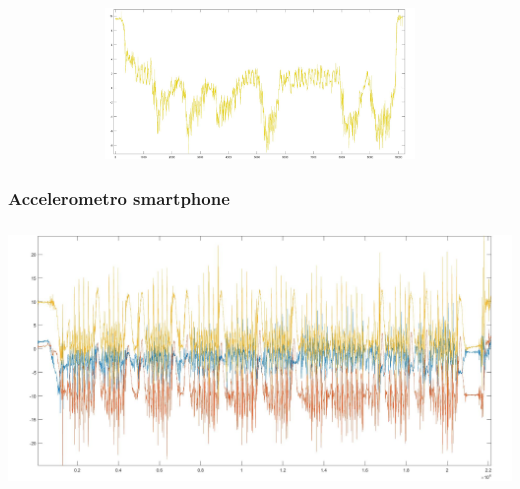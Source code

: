 \documentclass[a4paper]{article}
\begin{document}
\begin{minipage}{\linewidth}
\begin{center}
\includegraphics[width=154mm, height= 40mm]{./images/registrazione_tesi/accZ.jpg} 
\end{center}
\end{minipage}
\makebox[\linewidth]{}
\makebox[\linewidth]{}\makebox[\linewidth]{}\makebox[\linewidth]{}
\makebox[\linewidth]{}\makebox[\linewidth]{}\makebox[\linewidth]{}

\subsubsection{Accelerometro smartphone}
\begin{minipage}{\linewidth}
\begin{center}
\includegraphics[width=160mm, height= 70mm]{./images/registrazione_tesi/acc_ph.jpg} 
\end{center}
\end{minipage}
\makebox[\linewidth]{}
\makebox[\linewidth]{}\makebox[\linewidth]{}\makebox[\linewidth]{}
\makebox[\linewidth]{}\makebox[\linewidth]{}\makebox[\linewidth]{}
\makebox[\linewidth]{}\makebox[\linewidth]{}\makebox[\linewidth]{}
\end{document}
